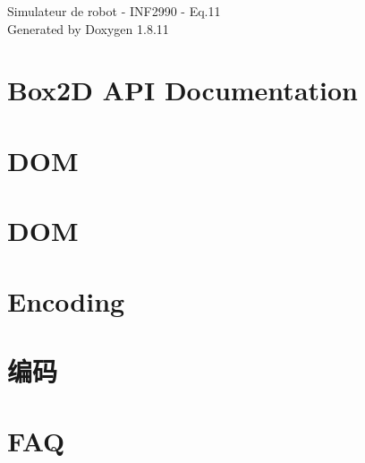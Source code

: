 \documentclass[twoside]{book}
\newcommand{\+}{\discretionary{\mbox{\scriptsize$\hookleftarrow$}}{}{}}
\newcommand{\clearemptydoublepage}{%
  \newpage{\pagestyle{empty}\cleardoublepage}%
}
\begin{document}
\hypersetup{pageanchor=false,
             bookmarksnumbered=true,
             pdfencoding=unicode
            }
\begin{titlepage}
\vspace*{7cm}
\begin{center}%
{\Large Simulateur de robot -\/ I\+N\+F2990 -\/ Eq.11 }\\
\vspace*{1cm}
{\large Generated by Doxygen 1.8.11}\\
\end{center}
\end{titlepage}
\clearemptydoublepage
\tableofcontents
\clearemptydoublepage
{}
\hypersetup{pageanchor=true}

\chapter{Box2D A\+PI Documentation}
\label{index}\hypertarget{index}{}
\chapter{D\+OM}
\label{md_Commun_Externe_RapidJSON_doc_dom}
\hypertarget{md_Commun_Externe_RapidJSON_doc_dom}{}

\chapter{D\+OM}
\label{md_Commun_Externe_RapidJSON_doc_dom.zh-cn}
\hypertarget{md_Commun_Externe_RapidJSON_doc_dom.zh-cn}{}

\chapter{Encoding}
\label{md_Commun_Externe_RapidJSON_doc_encoding}
\hypertarget{md_Commun_Externe_RapidJSON_doc_encoding}{}

\chapter{编码}
\label{md_Commun_Externe_RapidJSON_doc_encoding.zh-cn}
\hypertarget{md_Commun_Externe_RapidJSON_doc_encoding.zh-cn}{}

\chapter{F\+AQ}
\label{md_Commun_Externe_RapidJSON_doc_faq}
\hypertarget{md_Commun_Externe_RapidJSON_doc_faq}{}

\end{document}
